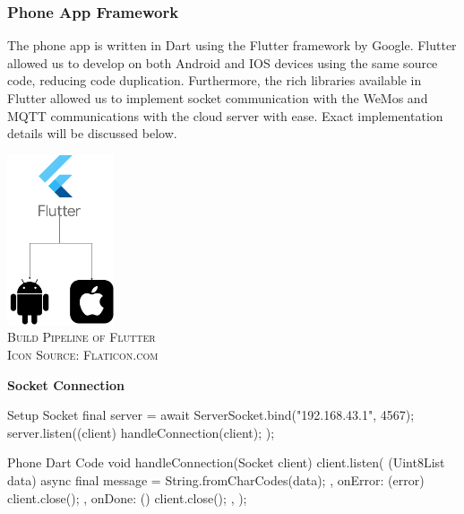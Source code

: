 \documentclass{article}
\begin{document}
\subsubsection{Phone App Framework}
\begin{multicols}{2}
 The phone app is written in Dart using the Flutter framework by Google. Flutter allowed us to develop on both Android and IOS devices using the same source code, reducing code duplication. Furthermore, the rich libraries available in Flutter allowed us to implement socket communication with the WeMos and MQTT communications with the cloud server with ease. Exact implementation details will be discussed below.
\columnbreak


\begin{center}
    \includegraphics[height=5cm]{report/images/dart-a-ios.drawio.png}\\
    \textsc{Build Pipeline of Flutter\\Icon Source: Flaticon.com}
\end{center}


\end{multicols}
\textbf{Socket Connection}
\begin{multicols}{2}
\begin{code}[dart]{Setup Socket}
final server = await ServerSocket.bind("192.168.43.1", 4567); 
server.listen((client) {
   handleConnection(client);
});
\end{code}
\columnbreak

\begin{code}[d]{Phone Dart Code}
void handleConnection(Socket client) {
    client.listen(
    	(Uint8List data) async {
     	 final message = String.fromCharCodes(data);
    	},
   	onError: (error) {
    	  client.close();
   	 },
   	 onDone: () {
     	 client.close();
    	},
  );
}  
\end{code}
\end{multicols}
\end{document}

